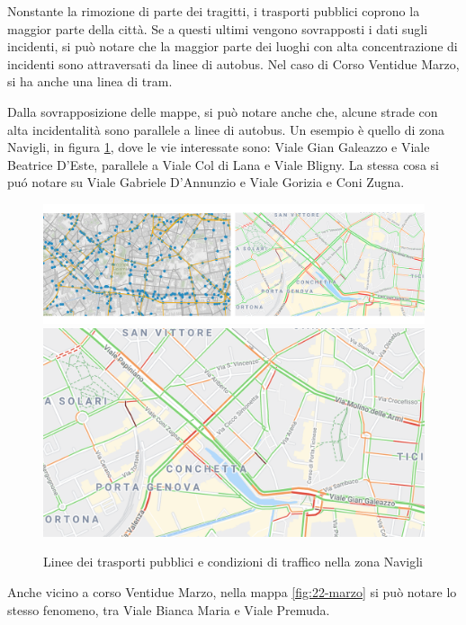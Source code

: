 \documentclass[a4paper]{report}
\begin{document}
Nonstante la rimozione di parte dei tragitti, i trasporti pubblici coprono 
la maggior parte della città.
Se a questi ultimi vengono sovrapposti i dati sugli incidenti, 
si può notare che la maggior parte dei luoghi con alta concentrazione di incidenti sono 
attraversati da linee di autobus. Nel caso di Corso Ventidue Marzo, si ha anche una linea di tram.

Dalla sovrapposizione delle mappe, si può notare anche che, alcune strade con alta incidentalità 
sono parallele a linee di autobus. 
Un esempio è quello di zona Navigli, in figura \ref{fig:navigli}, dove le vie interessate sono:
Viale Gian Galeazzo e Viale Beatrice D'Este, parallele a Viale Col di Lana e Viale Bligny.
La stessa cosa si pu\'o notare su Viale Gabriele D'Annunzio e Viale Gorizia e Coni Zugna.

\begin{figure}
    \includegraphics[width=0.51\linewidth]{../src/atm/navigli.png}
    \includegraphics[width=0.49\linewidth]{../src/codice_per_dati/googleMaps/navigli.png}
    \caption{Linee dei trasporti pubblici e condizioni di traffico nella zona Navigli}
    \label{fig:navigli}
\end{figure}

Anche vicino a corso Ventidue Marzo, nella mappa \ref{fig:22-marzo} si può 
notare lo stesso fenomeno, tra Viale Bianca Maria e Viale Premuda.
\end{document}
